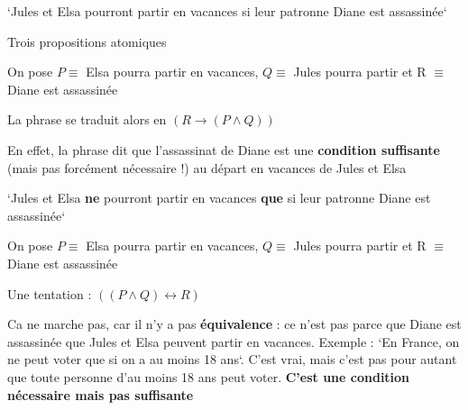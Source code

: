 \begin{frame}


`Jules et Elsa pourront partir en vacances si leur patronne Diane est assassinée`\pause\newline

Trois propositions atomiques\pause\newline

On pose $P \equiv $ Elsa pourra partir en vacances, $Q \equiv $ Jules pourra partir et R $\equiv$ Diane est assassinée \pause\newline 

La phrase se traduit alors en $(R \rightarrow (P \wedge Q))$\newline\pause

En effet, la phrase dit que l'assassinat de Diane est une \textbf{condition suffisante} (mais pas forcément nécessaire !) au départ en vacances de Jules et Elsa 

\end{frame}


\begin{frame}


`Jules et Elsa \textbf{ne} pourront partir en vacances \textbf{que} si leur patronne Diane est assassinée`\pause\newline

On pose $P \equiv $ Elsa pourra partir en vacances, $Q \equiv $ Jules pourra partir et R $\equiv$ Diane est assassinée \pause\newline 

Une tentation : $((P \wedge Q) \leftrightarrow R)$\pause\newline 

Ca ne marche pas, car il n'y a pas \textbf{équivalence} : ce n'est pas parce que Diane est assassinée que Jules et Elsa peuvent partir en vacances. \pause Exemple : `En France, on ne peut voter que si on a au moins 18 ans`. C'est vrai, mais c'est pas pour autant que toute personne d'au moins 18 ans peut voter. \textbf{C'est une condition nécessaire mais pas suffisante}

\end{frame}


